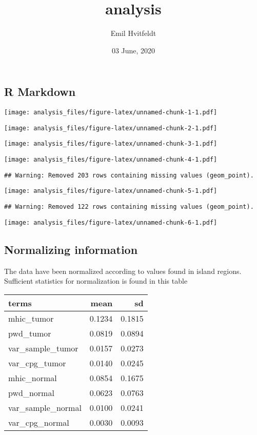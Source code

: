 \documentclass[
]{article}
\title{analysis}
\author{Emil Hvitfeldt}
\date{03 June, 2020}
\begin{document}
\maketitle

\hypertarget{r-markdown}{%
\subsection{R Markdown}\label{r-markdown}}

\texttt{[image: analysis\_files/figure-latex/unnamed-chunk-1-1.pdf]}

\texttt{[image: analysis\_files/figure-latex/unnamed-chunk-2-1.pdf]}

\texttt{[image: analysis\_files/figure-latex/unnamed-chunk-3-1.pdf]}

\texttt{[image: analysis\_files/figure-latex/unnamed-chunk-4-1.pdf]}

\begin{verbatim}
## Warning: Removed 203 rows containing missing values (geom_point).
\end{verbatim}

\texttt{[image: analysis\_files/figure-latex/unnamed-chunk-5-1.pdf]}

\begin{verbatim}
## Warning: Removed 122 rows containing missing values (geom_point).
\end{verbatim}

\texttt{[image: analysis\_files/figure-latex/unnamed-chunk-6-1.pdf]}

\hypertarget{normalizing-information}{%
\subsection{Normalizing information}\label{normalizing-information}}

The data have been normalized according to values found in island
regions. Sufficient statistics for normalization is found in this table

\begin{longtable}[]{@{}lrr@{}}
\toprule
terms & mean & sd\tabularnewline
\midrule
\endhead
mhic\_tumor & 0.1234 & 0.1815\tabularnewline
pwd\_tumor & 0.0819 & 0.0894\tabularnewline
var\_sample\_tumor & 0.0157 & 0.0273\tabularnewline
var\_cpg\_tumor & 0.0140 & 0.0245\tabularnewline
mhic\_normal & 0.0854 & 0.1675\tabularnewline
pwd\_normal & 0.0623 & 0.0763\tabularnewline
var\_sample\_normal & 0.0100 & 0.0241\tabularnewline
var\_cpg\_normal & 0.0030 & 0.0093\tabularnewline
\bottomrule
\end{longtable}
\end{document}
